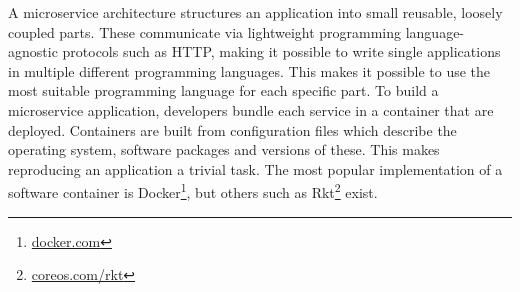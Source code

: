 A microservice architecture structures an application into small reusable,
loosely coupled parts. These communicate via lightweight programming
language-agnostic protocols such as HTTP, making it possible to write single
applications in multiple different programming languages. This makes it possible
to use the most suitable programming language for each specific part. To build a
microservice application, developers bundle each service in a container that are
deployed. Containers are built from configuration files which describe the
operating system, software packages and versions of these. This makes
reproducing an application a trivial task. The most popular implementation of a
software container is Docker\footnote{\url{docker.com}}, but others such as
Rkt\footnote{\url{coreos.com/rkt}} exist.  



% 

